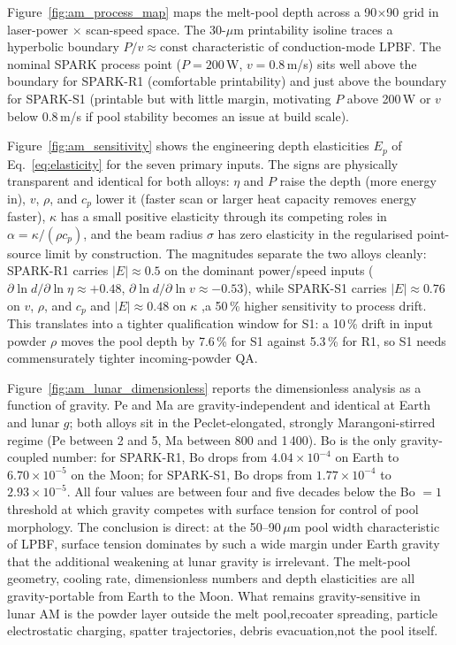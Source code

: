 \documentclass[11pt,a4paper]{article}
\begin{document}
Figure~\ref{fig:am_process_map} maps the melt-pool depth across a 90$\times$90 grid in laser-power $\times$ scan-speed space. The 30-$\mu$m printability isoline traces a hyperbolic boundary $P/v \approx \text{const}$ characteristic of conduction-mode LPBF. The nominal SPARK process point ($P = 200$\,W, $v = 0.8$\,m/s) sits well above the boundary for SPARK-R1 (comfortable printability) and just above the boundary for SPARK-S1 (printable but with little margin, motivating $P$ above 200\,W or $v$ below 0.8\,m/s if pool stability becomes an issue at build scale).

Figure~\ref{fig:am_sensitivity} shows the engineering depth elasticities $E_p$ of Eq.~\ref{eq:elasticity} for the seven primary inputs. The signs are physically transparent and identical for both alloys: $\eta$ and $P$ raise the depth (more energy in), $v$, $\rho$, and $c_p$ lower it (faster scan or larger heat capacity removes energy faster), $\kappa$ has a small positive elasticity through its competing roles in $\alpha = \kappa/(\rho c_p)$, and the beam radius $\sigma$ has zero elasticity in the regularised point-source limit by construction. The magnitudes separate the two alloys cleanly: SPARK-R1 carries $|E| \approx 0.5$ on the dominant power/speed inputs ($\partial \ln d / \partial \ln \eta \approx +0.48$, $\partial \ln d / \partial \ln v \approx -0.53$), while SPARK-S1 carries $|E| \approx 0.76$ on $v$, $\rho$, and $c_p$ and $|E| \approx 0.48$ on $\kappa$ ,a 50\,\% higher sensitivity to process drift. This translates into a tighter qualification window for S1: a 10\,\% drift in input powder $\rho$ moves the pool depth by 7.6\,\% for S1 against 5.3\,\% for R1, so S1 needs commensurately tighter incoming-powder QA.

Figure~\ref{fig:am_lunar_dimensionless} reports the dimensionless analysis as a function of gravity. Pe and Ma are gravity-independent and identical at Earth and lunar $g$; both alloys sit in the Peclet-elongated, strongly Marangoni-stirred regime (Pe between 2 and 5, Ma between 800 and 1\,400). Bo is the only gravity-coupled number: for SPARK-R1, Bo drops from $4.04 \times 10^{-4}$ on Earth to $6.70 \times 10^{-5}$ on the Moon; for SPARK-S1, Bo drops from $1.77 \times 10^{-4}$ to $2.93 \times 10^{-5}$. All four values are between four and five decades below the Bo $= 1$ threshold at which gravity competes with surface tension for control of pool morphology. The conclusion is direct: at the 50--90\,$\mu$m pool width characteristic of LPBF, surface tension dominates by such a wide margin under Earth gravity that the additional weakening at lunar gravity is irrelevant. The melt-pool geometry, cooling rate, dimensionless numbers and depth elasticities are all gravity-portable from Earth to the Moon. What remains gravity-sensitive in lunar AM is the powder layer outside the melt pool,recoater spreading, particle electrostatic charging, spatter trajectories, debris evacuation,not the pool itself.
\end{document}

